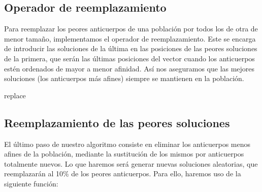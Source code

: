 \documentclass[10pt,a4paper]{article}
\begin{document}
\subsection{Operador de reemplazamiento}

Para reemplazar los peores anticuerpos de una población por todos los de otra de menor tamaño, implementamos el operador de reemplazamiento. Este se encarga de introducir las soluciones de la última en las posiciones de las peores soluciones de la primera, que serán las últimas posiciones del vector cuando los anticuerpos estén ordenados de mayor a menor afinidad.  Así nos aseguramos que las mejores soluciones (los anticuerpos más afines) siempre se mantienen en la población. 

\begin{algorithm}[H]
	\DontPrintSemicolon
	\caption{{\sc replace} }
\end{algorithm}

\subsection{Reemplazamiento de las peores soluciones}

El último paso de nuestro algoritmo consiste en eliminar los anticuerpos menos afines de la población, mediante la sustitución de los mismos por anticuerpos totalmente nuevos. Lo que haremos será generar nuevas soluciones aleatorias, que reemplazarán al 10\% de los peores anticuerpos. Para ello, haremos uso de la siguiente función:
\end{document}
